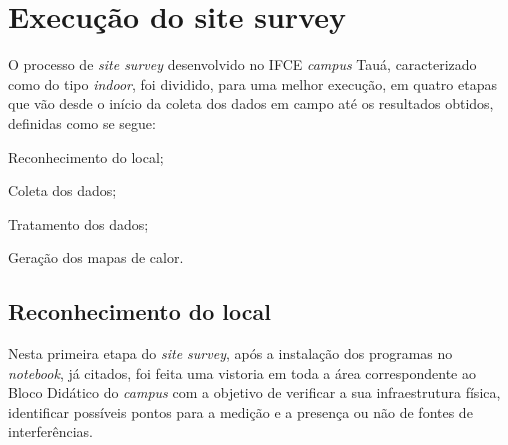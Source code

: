 \begin{table}[H]
\end{table}

\section{Execução do site survey}
\label{sec:execucao-site-survey}

O processo de \textit{site survey} desenvolvido no IFCE \textit{campus} Tauá, caracterizado como do tipo \textit{indoor}, foi dividido, para uma melhor execução, em quatro etapas que vão desde o início da coleta dos dados em campo até os resultados obtidos, definidas como se segue:

\begin{compactenum}
	\item Reconhecimento do local;
	\item Coleta dos dados;
	\item Tratamento dos dados;
	\item Geração dos mapas de calor.
\end{compactenum}

\subsection{Reconhecimento do local}
\label{subsec:reconhecimento-do-local}

Nesta primeira etapa do \textit{site survey}, após a instalação dos programas no \textit{notebook}, já citados, foi feita uma vistoria em toda a área correspondente ao Bloco Didático do \textit{campus} com a objetivo de verificar a sua infraestrutura física, identificar possíveis pontos para a medição e a presença ou não de fontes de interferências.

